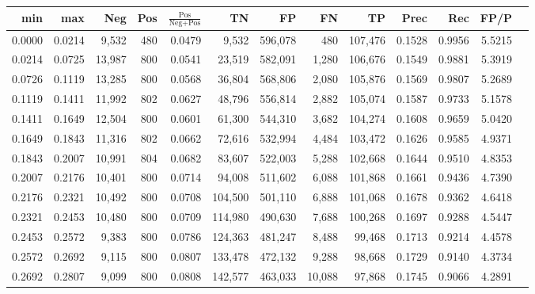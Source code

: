 \begin{tabular}{rrrrrrrrrrrrr}
\toprule
   min &    max &    Neg & Pos & $\frac{\text{Pos}}{\text{Neg}+\text{Pos}}$ &      TN &      FP &      FN &      TP &   Prec &    Rec &   FP/P \\
\midrule
0.0000 & 0.0214 &  9,532 & 480 &                                     0.0479 &   9,532 & 596,078 &     480 & 107,476 & 0.1528 & 0.9956 & 5.5215 \\
0.0214 & 0.0725 & 13,987 & 800 &                                     0.0541 &  23,519 & 582,091 &   1,280 & 106,676 & 0.1549 & 0.9881 & 5.3919 \\
0.0726 & 0.1119 & 13,285 & 800 &                                     0.0568 &  36,804 & 568,806 &   2,080 & 105,876 & 0.1569 & 0.9807 & 5.2689 \\
0.1119 & 0.1411 & 11,992 & 802 &                                     0.0627 &  48,796 & 556,814 &   2,882 & 105,074 & 0.1587 & 0.9733 & 5.1578 \\
0.1411 & 0.1649 & 12,504 & 800 &                                     0.0601 &  61,300 & 544,310 &   3,682 & 104,274 & 0.1608 & 0.9659 & 5.0420 \\
0.1649 & 0.1843 & 11,316 & 802 &                                     0.0662 &  72,616 & 532,994 &   4,484 & 103,472 & 0.1626 & 0.9585 & 4.9371 \\
0.1843 & 0.2007 & 10,991 & 804 &                                     0.0682 &  83,607 & 522,003 &   5,288 & 102,668 & 0.1644 & 0.9510 & 4.8353 \\
0.2007 & 0.2176 & 10,401 & 800 &                                     0.0714 &  94,008 & 511,602 &   6,088 & 101,868 & 0.1661 & 0.9436 & 4.7390 \\
0.2176 & 0.2321 & 10,492 & 800 &                                     0.0708 & 104,500 & 501,110 &   6,888 & 101,068 & 0.1678 & 0.9362 & 4.6418 \\
0.2321 & 0.2453 & 10,480 & 800 &                                     0.0709 & 114,980 & 490,630 &   7,688 & 100,268 & 0.1697 & 0.9288 & 4.5447 \\
0.2453 & 0.2572 &  9,383 & 800 &                                     0.0786 & 124,363 & 481,247 &   8,488 &  99,468 & 0.1713 & 0.9214 & 4.4578 \\
0.2572 & 0.2692 &  9,115 & 800 &                                     0.0807 & 133,478 & 472,132 &   9,288 &  98,668 & 0.1729 & 0.9140 & 4.3734 \\
0.2692 & 0.2807 &  9,099 & 800 &                                     0.0808 & 142,577 & 463,033 &  10,088 &  97,868 & 0.1745 & 0.9066 & 4.2891 \\

\end{tabular}
